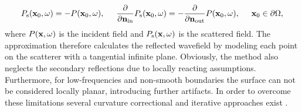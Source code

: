 \begin{itemize}
\begin{equation}
P_{\mathrm{s}}(\mathbf{x}_0,\omega) = -P(\mathbf{x}_0,\omega), \hspace{5mm} \frac{\partial}{\partial \mathbf{n}_{\mathrm{in}}} P_{\mathrm{s}}(\mathbf{x}_0,\omega) = -\frac{\partial}{\partial \mathbf{n}_{\mathrm{out}}} P(\mathbf{x}_0,\omega), \hspace{5mm} \mathbf{x}_0 \in \partial \Omega,
\label{Eq:SFS_theory:tangent_plane}
\end{equation}
where $P(\mathbf{x},\omega)$ is the incident field and $P_{\mathrm{s}}(\mathbf{x},\omega)$ is the scattered field.
The approximation therefore calculates the reflected wavefield by modeling each point on the scatterer with a tangential infinite plane. 
Obviously, the method also neglects the secondary reflections due to locally reacting assumptions. Furthermore, for low-frequencies and non-smooth boundaries the surface can not be considered locally planar, introducing further artifacts. 
In order to overcome these limitations several curvature correctional and iterative approaches exist \cite{Elfouhaily2004}.

%
\end{itemize}

